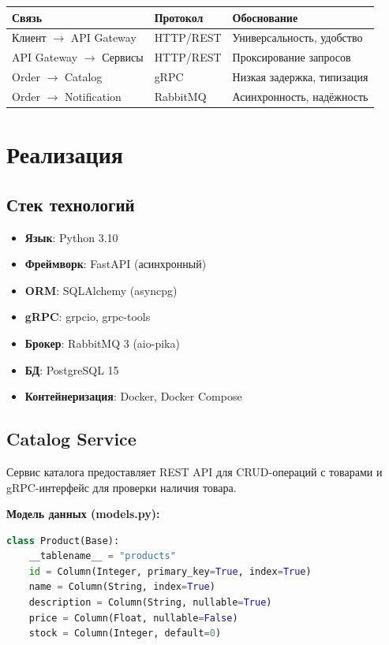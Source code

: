 \documentclass[14pt]{article}
\begin{document}
\begin{center}
\begin{tabular}{|l|l|l|}
\hline
\textbf{Связь} & \textbf{Протокол} & \textbf{Обоснование} \\
\hline
Клиент $\rightarrow$ API Gateway & HTTP/REST & Универсальность, удобство \\
\hline
API Gateway $\rightarrow$ Сервисы & HTTP/REST & Проксирование запросов \\
\hline
Order $\rightarrow$ Catalog & gRPC & Низкая задержка, типизация \\
\hline
Order $\rightarrow$ Notification & RabbitMQ & Асинхронность, надёжность \\
\hline
\end{tabular}
\end{center}

\section{Реализация}

\subsection{Стек технологий}

\begin{itemize}
    \item \textbf{Язык}: Python 3.10
    \item \textbf{Фреймворк}: FastAPI (асинхронный)
    \item \textbf{ORM}: SQLAlchemy (asyncpg)
    \item \textbf{gRPC}: grpcio, grpc-tools
    \item \textbf{Брокер}: RabbitMQ 3 (aio-pika)
    \item \textbf{БД}: PostgreSQL 15
    \item \textbf{Контейнеризация}: Docker, Docker Compose
\end{itemize}

\subsection{Catalog Service}

Сервис каталога предоставляет REST API для CRUD-операций с товарами и gRPC-интерфейс для проверки наличия товара.

\textbf{Модель данных (models.py):}
\begin{lstlisting}[language=Python]
class Product(Base):
    __tablename__ = "products"
    id = Column(Integer, primary_key=True, index=True)
    name = Column(String, index=True)
    description = Column(String, nullable=True)
    price = Column(Float, nullable=False)
    stock = Column(Integer, default=0)
\end{lstlisting}
\end{document}
